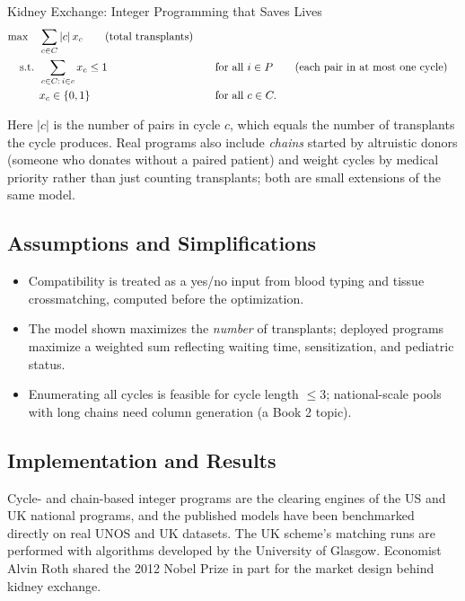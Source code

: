 \begin{casestudybox}{Kidney Exchange: Integer Programming that Saves Lives}
\begin{align*}
\max \quad & \sum_{c \in C} |c| \, x_c   \tag{total transplants} \\
\text{ s.t. }        & \sum_{c \in C :\, i \in c} x_c \leq 1 &&\quad \text{for all } i \in P   \tag{each pair in at most one cycle} \\
             & x_c \in \{0,1\} &&\quad \text{for all } c \in C.
\end{align*}

Here $|c|$ is the number of pairs in cycle $c$, which equals the number of transplants the cycle produces.  Real programs also include \emph{chains} started by altruistic donors (someone who donates without a paired patient) and weight cycles by medical priority rather than just counting transplants; both are small extensions of the same model.

\subsection*{Assumptions and Simplifications}
\begin{itemize}
\item Compatibility is treated as a yes/no input from blood typing and tissue crossmatching, computed before the optimization.
\item The model shown maximizes the \emph{number} of transplants; deployed programs maximize a weighted sum reflecting waiting time, sensitization, and pediatric status.
\item Enumerating all cycles is feasible for cycle length $\le 3$; national-scale pools with long chains need column generation (a Book 2 topic).
\end{itemize}

\subsection*{Implementation and Results}
Cycle- and chain-based integer programs are the clearing engines of the US and UK national programs, and the published models have been benchmarked directly on real UNOS and UK datasets.  The UK scheme's matching runs are performed with algorithms developed by the University of Glasgow.  Economist Alvin Roth shared the 2012 Nobel Prize in part for the market design behind kidney exchange.


\end{casestudybox}
